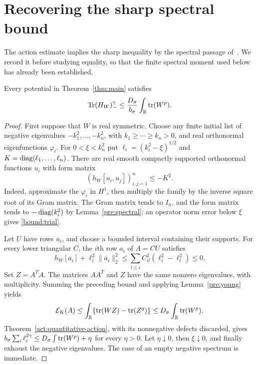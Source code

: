 \section{Recovering the sharp spectral bound}\label{bound:section}

The action estimate implies the sharp inequality by the spectral passage
of~\cite[Section~7]{MLT}. We record it before studying equality, so that
the finite spectral moment used below has already been established.

\begin{proposition}\label{bound:sharp}
Every potential in Theorem~\ref{thm:main} satisfies
\[
 \operatorname{Tr}(H_W)_-^\gamma\le\frac{D_\sigma}{b_\sigma}
                         \int_\mathbb R\operatorname{tr}(W^p).
\]
\end{proposition}

\begin{proof}
First suppose that $W$ is real symmetric. Choose any finite initial list
of negative eigenvalues $-k_1^2,\ldots,-k_n^2$, with
$k_1\ge\cdots\ge k_n>0$, and real orthonormal eigenfunctions $\varphi_i$.
For $0<\xi<k_n^2$ put $\ell_i=(k_i^2-\xi)^{1/2}$ and
$K=\operatorname{diag}(\ell_1,\ldots,\ell_n)$. There are real smooth compactly
supported orthonormal functions $u_i$ with form matrix
\begin{equation}\label{bound:trial}
 (h_W[u_i,u_j])_{i,j=1}^n\le-K^2.
\end{equation}
Indeed, approximate the $\varphi_i$ in $H^1$, then multiply the family
by the inverse square root of its Gram matrix. The Gram matrix tends to
$I_n$, and the form matrix tends to $-\operatorname{diag}(k_i^2)$ by
Lemma~\ref{pre:spectral}; an operator norm error below $\xi$ gives
\eqref{bound:trial}.

Let $U$ have rows $u_i$, and choose a bounded interval containing their
supports. For every lower triangular $C$, the $i$th row $a_i$ of $A=CU$
satisfies
\[
 h_W[a_i]+\ell_i^2\|a_i\|_2^2
 \le\sum_{l\le i}C_{il}^2(\ell_i^2-\ell_l^2)\le0.
\]
Set $Z=A^TA$. The matrices $AA^T$ and $Z$ have the same nonzero
eigenvalues, with multiplicity. Summing the preceding bound and applying
Lemma~\ref{pre:young} yields
\[
 \mathcal E_K(A)
 \le\int_\mathbb R\{\operatorname{tr}(WZ)-\operatorname{tr}(Z^q)\}
 \le D_\sigma\int_\mathbb R\operatorname{tr}(W^p).
\]
Theorem~\ref{act:quantitative-action}, with its nonnegative defects
discarded, gives
$b_\sigma\sum_i\ell_i^{2\gamma}\le D_\sigma\int\operatorname{tr}(W^p)+\eta$
for every $\eta>0$. Let $\eta\downarrow0$, then $\xi\downarrow0$,
and finally exhaust the negative eigenvalues. The case of an empty
negative spectrum is immediate.


\end{proof}
